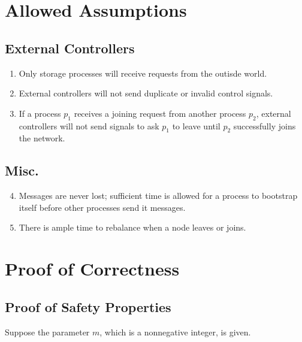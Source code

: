 \documentclass[11pt]{article}
\begin{document}
\section{Allowed Assumptions}

\subsection{External Controllers}
\begin{enumerate}[\text{A}1]
\item \label{A:finite_time_red} Only storage processes will receive requests from the outisde world.

\item \label{A:no_invalid_signals} External controllers will not send duplicate or invalid control signals.

\item \label{A:E_guarantees_nodes_entering_network} If a process $p_1$ receives a joining request from another process $p_2$, external controllers will not send signals to ask $p_1$ to leave until $p_2$ successfully joins the network.
\end{enumerate}

\subsection{Misc.}
\begin{enumerate}[\text{A}1]
\setcounter{enumi}{3}
\item \label{A:message_never_lost} Messages are never lost; sufficient time is allowed for a process to bootstrap itself before other processes send it messages.
\item There is ample time to rebalance when a node leaves or joins.
\end{enumerate}


\section{Proof of Correctness}


\subsection{Proof of Safety Properties}
Suppose the parameter $m$, which is a nonnegative integer, is given.
\end{document}
